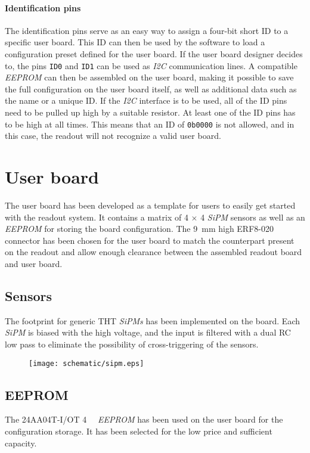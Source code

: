 \subsubsection{Identification pins}
The identification pins serve as an easy way to assign a four-bit short ID to a specific user board. This ID can then be used by the software to load a configuration preset defined for the user board. If the user board designer decides to, the pins \verb|ID0| and \verb|ID1| can be used as \emph{I2C} communication lines. A compatible \emph{EEPROM} can then be assembled on the user board, making it possible to save the full configuration on the user board itself, as well as additional data such as the name or a unique ID. If the \emph{I2C} interface is to be used, all of the ID pins need to be pulled up high by a suitable resistor. At least one of the ID pins has to be high at all times. This means that an ID of \verb|0b0000| is not allowed, and in this case, the readout will not recognize a valid user board. 
%
\chapter{User board}
The user board has been developed as a template for users to easily get started with the readout system. It contains a matrix of 4 $\times$ 4 \emph{SiPM} sensors as well as an \emph{EEPROM} for storing the board configuration. The \SI{9}{\milli\meter} high ERF8-020 connector has been chosen for the user board to match the counterpart present on the readout and allow enough clearance between the assembled readout board and user board. \cite{samtec_erm8_020_cycles}

\section{Sensors}
The footprint for generic THT \emph{SiPMs} has been implemented on the board. Each \emph{SiPM} is biased with the high voltage, and the input is filtered with a dual RC low pass to eliminate the possibility of cross-triggering of the sensors. 

\FloatBarrier
\begin{figure}[htp!]
    \centering
    \texttt{[image: schematic/sipm.eps]}
    \label{fig:sipm}
\end{figure}
\FloatBarrier

\section{EEPROM}
The 24AA04T-I/OT \SI{4}{\kilo\bit} \emph{EEPROM} has been used on the user board for the configuration storage. It has been selected for the low price and sufficient capacity. \cite{microchip_24aa04t_i_ot}

